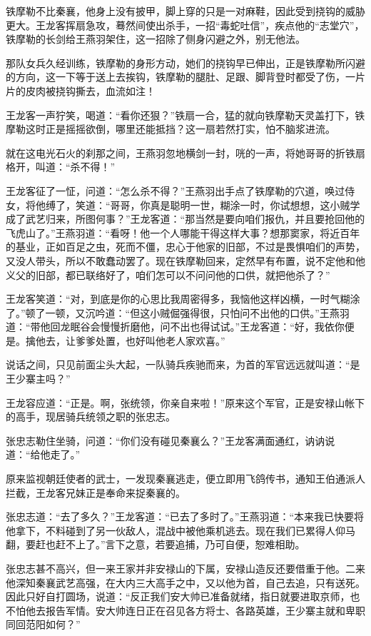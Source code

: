 \documentclass[12pt,oneside]{book}
\begin{document}
铁摩勒不比秦襄，他身上没有披甲，脚上穿的只是一对麻鞋，因此受到挠钩的威胁更大。王龙客挥扇急攻，蓦然间使出杀手，一招``毒蛇吐信''，疾点他的``志堂穴''，铁摩勒的长剑给王燕羽架住，这一招除了侧身闪避之外，别无他法。

那队女兵久经训练，铁摩勒的身形方动，她们的挠钩早已伸出，正是铁摩勒所闪避的方向，这一下等于送上去挨钩，铁摩勒的腿肚、足跟、脚背登时都受了伤，一片片的皮肉被挠钩撕去，血流如注！

王龙客一声狞笑，喝道：``看你还狠？''铁扇一合，猛的就向铁摩勒天灵盖打下，铁摩勒这时正是摇摇欲倒，哪里还能抵挡？这一扇若然打实，怕不脑浆进流。

就在这电光石火的刹那之间，王燕羽忽地横剑一封，咣的一声，将她哥哥的折铁扇格开，叫道：``杀不得！''

王龙客征了一怔，问道：``怎么杀不得？''王燕羽出手点了铁摩勒的穴道，唤过侍女，将他缚了，笑道：``哥哥，你真是聪明一世，糊涂一时，你试想想，这小贼学成了武艺归来，所图何事？''王龙客道：``那当然是要向咱们报仇，并且要抢回他的飞虎山了。''王燕羽道：``看呀！他一个人哪能干得这样大事？想那窦家，将近百年的基业，正如百足之虫，死而不僵，忠心于他家的旧部，不过是畏惧咱们的声势，又没人带头，所以不敢蠢动罢了。现在铁摩勒回来，定然早有布置，说不定他和他义父的旧部，都已联络好了，咱们怎可以不问问他的口供，就把他杀了？''

王龙客笑道：``对，到底是你的心思比我周密得多，我恼他这样凶横，一时气糊涂了。''顿了一顿，又沉吟道：``但这小贼倔强得很，只怕问不出他的口供。''王燕羽道：``带他回龙眠谷会慢慢折磨他，问不出也得试试。''王龙客道：``好，我依你便是。擒他去，让爹爹处置，也好叫他老人家欢喜。''

说话之间，只见前面尘头大起，一队骑兵疾驰而来，为首的军官远远就叫道：``是王少寨主吗？''

王龙容应道：``正是。啊，张统领，你亲自来啦！''原来这个军官，正是安禄山帐下的高手，现居骑兵统领之职的张忠志。

张忠志勒住坐骑，问道：``你们没有碰见秦襄么？''王龙客满面通红，讷讷说道：``给他走了。''

原来监视朝廷使者的武士，一发现秦襄逃走，便立即用飞鸽传书，通知王伯通派人拦截，王龙客兄妹正是奉命来捉秦襄的。

张忠志道：``去了多久？''王龙客道：``已去了多时了。''王燕羽道：``本来我已快要将他拿下，不料碰到了另一伙敌人，混战中被他乘机逃去。现在我们已累得人仰马翻，要赶也赶不上了。''言下之意，若要追捕，乃可自便，恕难相助。

张忠志甚不高兴，但一来王家并非安禄山的下属，安禄山造反还要借重于他。二来他深知秦襄武艺高强，在大内三大高手之中，又以他为首，自己去追，只有送死。因此只好自打圆场，说道：``反正我们安大帅已准备就绪，指日就要进取京师，也不怕他去报告军情。安大帅连日正在召见各方将士、各路英雄，王少寨主就和卑职同回范阳如何？''
\end{document}
